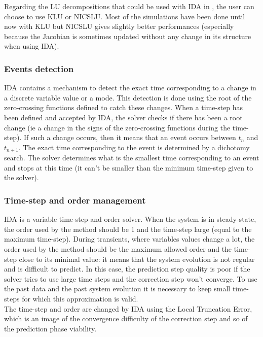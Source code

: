 \documentclass[a4paper, 12pt]{report}
\begin{document}
Regarding the LU decompositions that could be used with \ac{IDA} in \Dynawo , the user can choose to use KLU or NICSLU. Most of the simulations have been done until now with KLU but NICSLU gives slightly better performances (especially because the Jacobian is sometimes updated without any change in its structure when using \ac{IDA}).

\subsubsection{Events detection}

\ac{IDA} contains a mechanism to detect the exact time corresponding to a change in a discrete variable value or a mode. This detection is done using the root of the zero-crossing functions defined to catch these changes.
When a time-step has been defined and accepted by \ac{IDA}, the solver checks if there has been a root change (ie a change in the signs of the zero-crossing functions during the time-step). If such a change occurs, then it means that an event occurs between $t_{n}$ and $t_{n+1}$. The exact time corresponding to the event is determined by a dichotomy search.
The solver determines what is the smallest time corresponding to an event and stops at this time (it can't be smaller than the minimum time-step given to the solver).

\subsubsection{Time-step and order management}

\ac{IDA} is a variable time-step and order solver. When the system is in steady-state, the order used by the method should be 1 and the time-step large (equal to the maximum time-step). During transients, where variables values change a lot, the order used by the method should be the maximum allowed order and the time-step close to its minimal value: it means that the system evolution is not regular and is difficult to predict. In this case, the prediction step quality is poor if the solver tries to use large time steps and the correction step won't converge. To use the past data and the past system evolution it is necessary to keep small time-steps for which this approximation is valid. \\

The time-step and order are changed by \ac{IDA} using the Local Truncation Error, which is an image of the convergence difficulty of the correction step and so of the prediction phase viability.
\end{document}
